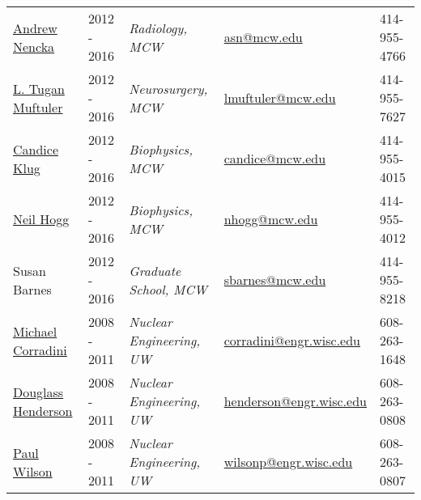 
\begin{center}
\begin{minipage}{\textwidth}
\begin{tabular}{p{3.2cm}p{2.2cm}p{3.7cm}p{5.0cm}p{2.4cm}}

\href{http://www.mcw.edu/radiology/faculty/Andrew-Nencka-PhD.htm}{Andrew Nencka} & 2012 - 2016  & {\textit{Radiology, MCW}}& \href{mailto:asn@mcw.edu}{asn@mcw.edu}  &  414-955-4766 \\
\href{http://neurosurgery.mcw.edu/faculty/research/muftuler/}{L. Tugan Muftuler} & 2012 - 2016  & {\textit{Neurosurgery, MCW}}& \href{mailto:lmuftuler@mcw.edu}{lmuftuler@mcw.edu}  &  414-955-7627 \\
\href{http://www.mcw.edu/biophysics/facultyandstaff/CandiceSKlug.htm}{Candice Klug} & 2012 - 2016  & {\textit{Biophysics, MCW}}& \href{mailto:candice@mcw.edu}{candice@mcw.edu}  &  414-955-4015 \\
\href{http://www.mcw.edu/biophysics/facultyandstaff/NeilHogg.htm}{Neil Hogg} & 2012 - 2016  & {\textit{Biophysics, MCW}}& \href{mailto:nhogg@mcw.edu}{nhogg@mcw.edu} & 414-955-4012 \\
Susan Barnes & 2012 - 2016 & \textit{Graduate School, MCW} &  \href{mailto:sbarnes@mcw.edu}{sbarnes@mcw.edu} &   414-955-8218 \\ 
\href{https://directory.engr.wisc.edu/ep/faculty/corradini\_michael}{Michael Corradini} & 2008 - 2011 & \textit{Nuclear Engineering, UW}  & \href{mailto:corradini@engr.wisc.edu}{corradini@engr.wisc.edu} &  608-263-1648 \\ 
\href{https://directory.engr.wisc.edu/ep/faculty/henderson\_douglass}{Douglass Henderson} & 2008 - 2011  & \textit{Nuclear Engineering, UW} & \href{mailto:henderson@engr.wisc.edu}{henderson@engr.wisc.edu} &  608-263-0808 \\ 
\href{https://directory.engr.wisc.edu/ep/faculty/wilson\_paul}{Paul Wilson} & 2008 - 2011  & \textit{Nuclear Engineering, UW} & \href{mailto:wilsonp@engr.wisc.edu}{wilsonp@engr.wisc.edu} &  608-263-0807 \\ 

\end{tabular}
\end{minipage}
\end{center}


